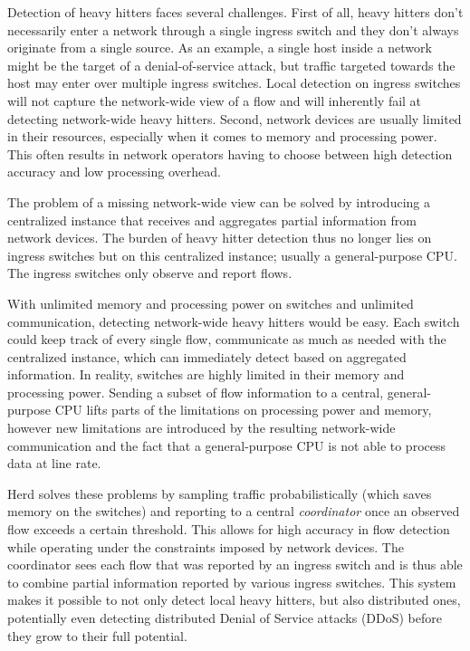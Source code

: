 \documentclass[11pt,oneside,a4paper]{article}
\begin{document}
Detection of heavy hitters faces several challenges. First of all, heavy hitters don't necessarily enter a network through a single ingress switch and they don't always originate from a single source. As an example, a single host inside a network might be the target of a denial-of-service attack, but traffic targeted towards the host may enter over multiple ingress switches. Local detection on ingress switches will not capture the network-wide view of a flow and will inherently fail at detecting network-wide heavy hitters. Second, network devices are usually limited in their resources, especially when it comes to memory and processing power. This often results in network operators having to choose between high detection accuracy and low processing overhead.

\noindent The problem of a missing network-wide view can be solved by introducing a centralized instance that receives and aggregates partial information from network devices. The burden of heavy hitter detection thus no longer lies on ingress switches but on this centralized instance; usually a general-purpose CPU. The ingress switches only observe and report flows.

\noindent With unlimited memory and processing power on switches and unlimited communication, detecting network-wide heavy hitters would be easy. Each switch could keep track of every single flow, communicate as much as needed with the centralized instance, which can immediately detect based on aggregated information. In reality, switches are highly limited in their memory and processing power. Sending a subset of flow information to a central, general-purpose CPU lifts parts of the limitations on processing power and memory, however new limitations are introduced by the resulting network-wide communication and the fact that a general-purpose CPU is not able to process data at line rate.

Herd \cite{anon2019herd} solves these problems by sampling traffic probabilistically (which saves memory on the switches) and reporting to a central \textit{coordinator} once an observed flow exceeds a certain threshold. This allows for high accuracy in flow detection while operating under the constraints imposed by network devices. The coordinator sees each flow that was reported by an ingress switch and is thus able to combine partial information reported by various ingress switches. This system makes it possible to not only detect local heavy hitters, but also distributed ones, potentially even detecting distributed Denial of Service attacks (DDoS) before they grow to their full potential.
\end{document}
